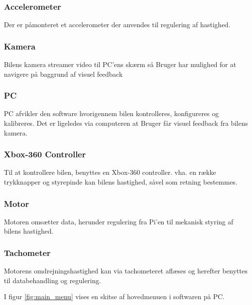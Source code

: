 \subsubsection{Accelerometer}
Der er påmonteret et accelerometer der anvendes til regulering af hastighed.

\subsubsection{Kamera}
Bilens kamera streamer video til PC'ens skærm så Bruger har mulighed for at navigere på baggrund af visuel feedback

\subsubsection{PC}
PC afvikler den software hvorigennem bilen kontrolleres, konfigureres og kalibreres. Det er ligeledes via computeren at Bruger får visuel feedback fra bilens kamera. 

\subsubsection{Xbox-360 Controller}
Til at kontrollere bilen, benyttes en Xbox-360 controller. vha. en række trykknapper og styrepinde kan bilens hastighed, såvel som retning bestemmes. 

\subsubsection{Motor}
Motoren omsætter data, herunder regulering fra Pi'en til mekanisk styring af bilens hastighed.

\subsubsection{Tachometer}
Motorens omdrejningshastighed kan via tachometeret aflæses og herefter benyttes til databehandling og regulering. 
\clearpage

I figur \ref{fig:main_menu} vises en skitse af hovedmenuen i softwaren på PC. 

